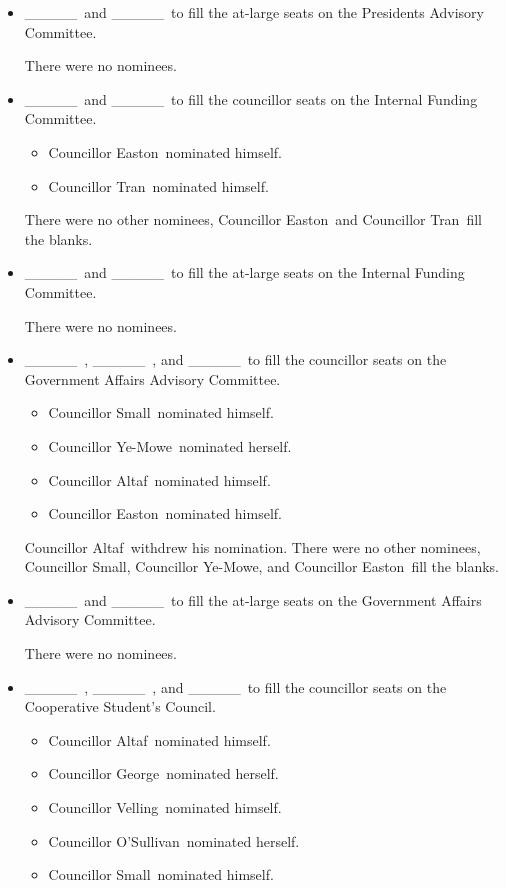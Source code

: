 \documentclass[12pt, letterpaper]{article}
\newcommand{\blank}{\_\_\_\_\_\ }
\newcommand{\tomson}{Councillor Tran}
\newcommand{\rebecca}{Councillor George}
\newcommand{\stephanie}{Councillor Ye-Mowe}
\newcommand{\subham}{Councillor Altaf}
\newcommand{\ben}{Councillor Easton}
\newcommand{\jason}{Councillor Small}
\newcommand{\elizabeth}{Councillor O'Sullivan}
\newcommand{\seneca}{Councillor Velling}
\begin{document}
\begin{motion}
\begin{itemize}
        \item \blank and \blank to fill the at-large seats on the 
            Presidents Advisory Committee.

            There were no nominees.

        \item \blank and \blank to fill the councillor seats on the 
            Internal Funding Committee.
            \begin{itemize}
                \item \ben\ nominated himself.
                \item \tomson\ nominated himself.
            \end{itemize}

            There were no other nominees, \ben\ and \tomson\ fill the 
            blanks. 

        \item \blank and \blank to fill the at-large seats on the 
            Internal Funding Committee.

            There were no nominees.

        \item \blank, \blank, and \blank to fill the councillor seats on the 
            Government Affairs Advisory Committee.
            \begin{itemize}
                \item \jason\ nominated himself.
                \item \stephanie\ nominated herself.
                \item \subham\ nominated himself.
                \item \ben\ nominated himself.
            \end{itemize}

            \subham\ withdrew his nomination. There were no other nominees,
            \jason, \stephanie, and \ben\ fill the blanks. 

        \item \blank and \blank to fill the at-large seats on the 
            Government Affairs Advisory Committee.

            There were no nominees.

        \item \blank, \blank, and \blank to fill the councillor seats on the 
            Cooperative Student's Council.
            \begin{itemize}
                \item \subham\ nominated himself.
                \item \rebecca\ nominated herself.
                \item \seneca\ nominated himself.
                \item \elizabeth\ nominated herself.
                \item \jason\ nominated himself.
            \end{itemize}


\end{itemize}
\end{motion}
\end{document}
